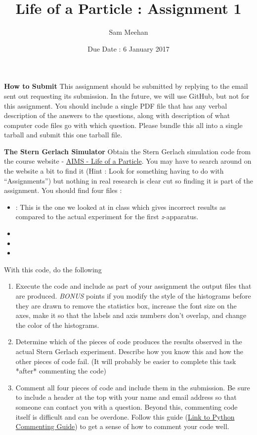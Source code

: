 \documentclass[12pt]{article}
\title{Life of a Particle : Assignment 1}
\author{Sam Meehan}
\date{Due Date : 6 January 2017}
\begin{document}
\maketitle

\textbf{How to Submit}
\newline
This assignment should be submitted by replying to the email sent out requesting its submission.  In the future, we will use GitHub, but not for this assignment.  You should include a single PDF file that has any verbal description of the answers to the questions, along with description of what computer code files go with which question.  Please bundle this all into a single tarball and submit this one tarball file.  

\textbf{The Stern Gerlach Simulator} 
\newline
Obtain the Stern Gerlach simulation code from the course website - \href{https://sites.google.com/a/aims.edu.gh/the-life-of-a-particle/home}{AIMS - Life of a Particle}.  You may have to search around on the website a bit to find it (Hint : Look for something having to do with ``Assignments'') but nothing in real research is clear cut so finding it is part of the assignment.  You should find four files :
\begin{itemize}[noitemsep]
\item \small{} : This is the one we looked at in class which gives incorrect results as compared to the actual experiment for the first \textit{z}-apparatus.
\item \small{}
\item \small{}
\item \small{}
\end{itemize}
With this code, do the following
\begin{enumerate}
\item Execute the code and include as part of your assignment the output \small{} files that are produced. \textit{BONUS} points if you modify the style of the histograms before they are drawn to remove the statistics box, increase the font size on the axes, make it so that the labels and axis numbers don't overlap, and change the color of the histograms.
\item Determine which of the pieces of code produces the results observed in the actual Stern Gerlach experiment.  Describe how you know this and how the other pieces of code fail. (It will probably be easier to complete this task *after* commenting the code)
\item Comment all four pieces of code and include them in the submission.  Be sure to include a header at the top with your name and email address so that someone can contact you with a question.  Beyond this, commenting code itself is difficult and can be overdone.  Follow this guide (\href{https://www.digitalocean.com/community/tutorials/how-to-write-comments-in-python-3}{Link to Python Commenting Guide}) to get a sense of how to comment your code well.
\end{enumerate}
\end{document}
